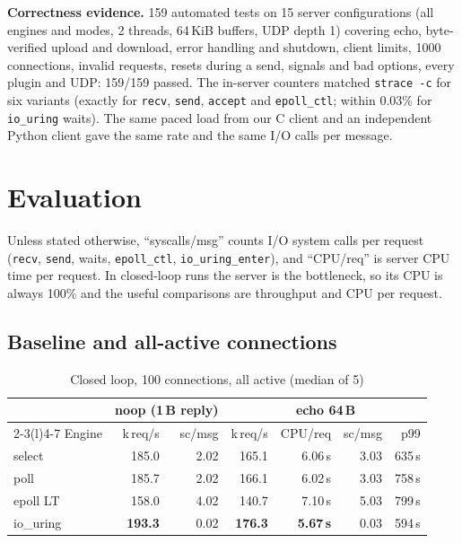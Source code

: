\documentclass[conference,10pt]{IEEEtran}
\newcommand{\krps}{k\,req/s}
\newcommand{\us}{\,\textmu s}
\newcommand{\code}[1]{\texttt{#1}}
\begin{document}
\textbf{Correctness evidence.} 159 automated tests on 15 server configurations (all engines and modes, 2 threads, 64\,KiB buffers, UDP depth 1) covering echo, byte-verified upload and download, error handling and shutdown, client limits, 1000 connections, invalid requests, resets during a send, signals and bad options, every plugin and UDP: 159/159 passed. The in-server counters matched \code{strace -c} for six variants (exactly for \code{recv}, \code{send}, \code{accept} and \code{epoll\_ctl}; within 0.03\% for \code{io\_uring} waits). The same paced load from our C client and an independent Python client gave the same rate and the same I/O calls per message.

\section{Evaluation}
Unless stated otherwise, ``syscalls/msg'' counts I/O system calls per request (\code{recv}, \code{send}, waits, \code{epoll\_ctl}, \code{io\_uring\_enter}), and ``CPU/req'' is server CPU time per request. In closed-loop runs the server is the bottleneck, so its CPU is always 100\% and the useful comparisons are throughput and CPU per request.

\subsection{Baseline and all-active connections}
\begin{table}[t]
\caption{Closed loop, 100 connections, all active (median of 5)}
\label{tab:echo}
\centering\small
\begin{tabular}{@{}lrrrrrr@{}}
\toprule
 & \multicolumn{2}{c}{noop (1\,B reply)} & \multicolumn{4}{c}{echo 64\,B}\\
\cmidrule(lr){2-3}\cmidrule(l){4-7}
Engine & \krps & sc/msg & \krps & CPU/req & sc/msg & p99 \\
\midrule
select   & 185.0 & 2.02 & 165.1 & 6.06\us & 3.03 & 635\us\\
poll     & 185.7 & 2.02 & 166.1 & 6.02\us & 3.03 & 758\us\\
epoll LT & 158.0 & 4.02 & 140.7 & 7.10\us & 5.03 & 799\us\\
io\_uring& \textbf{193.3} & 0.02 & \textbf{176.3} & \textbf{5.67\us} & 0.03 & 594\us\\
\bottomrule
\end{tabular}
\end{table}
\end{document}
